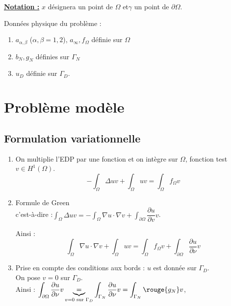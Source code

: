 \documentclass[12pt,a4paper]{article}
\begin{document}
	\textbf{\underline{Notation :}} $x$ désignera un point de $\Omega$ et$\gamma$ un point de $\partial\Omega$.
	
	Données physique du problème :
	\begin{enumerate}
		\item[$\star$] $a_{\alpha,\beta}$ ($\alpha,\beta=1,2$), $a_\infty, f_\Omega$ définie sur $\Omega$
		\item[$\star$] $b_N,g_N$ définies sur $\Gamma_N$
		\item[$\star$] $u_D$ définie sur $\Gamma_D$.
	\end{enumerate}
	
	\section{Problème modèle}
	
	\subsection{Formulation variationnelle}
	\begin{enumerate}
		\item[$\star$] On multiplie l'EDP par une fonction et on intègre sur $\Omega$, fonction test $v \in H^1(\Omega)$.
		\[
		\displaystyle -\int_\Omega \Delta u v + \int_\Omega uv = \int_\Omega f_\Omega v
		\]
		
		\item[$\star$] Formule de Green\\
		c'est-à-dire :$\displaystyle \int_\Omega \Delta u v = - \int_\Omega \nabla u \cdot \nabla v + \int_{\partial \Omega}\dfrac{\partial u}{\partial v} v$.\\
		\begin{minipage}[t]{10cm}
			Ainsi :
		\[
		\displaystyle \int_\Omega \nabla u \cdot \nabla v + \int_\Omega uv = \int_\Omega f_\Omega v + \int_{\partial\Omega} \dfrac{\partial u}{\partial \nu}v
		\]
		\end{minipage}
		
		\item[$\star$] Prise en compte des conditions aux bords : $u$ est donnée sur $\Gamma_D$.\\
		On pose $v = 0$ sur $\Gamma_D$.\\
		Ainsi : $\displaystyle\int_{\partial\Omega} \dfrac{\partial u}{\partial\nu} v \underbrace{=}_{v = 0 \text{ sur } \Gamma_D} \int_{\Gamma_N} \dfrac{\partial u}{\partial\nu} v = \int_{\Gamma_N} \rouge{g_N} v$, \scriptsize{}
	\end{enumerate}
	
\end{document}

